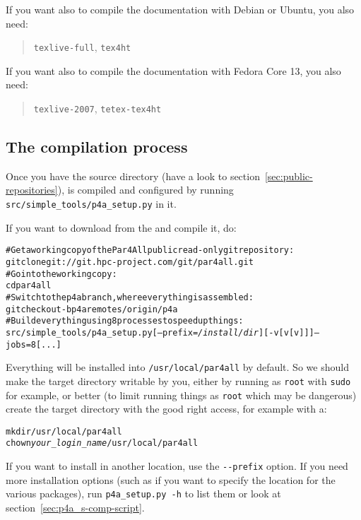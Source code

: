 \documentclass[a4paper]{article}
\begin{document}

If you want also to compile the documentation with Debian or Ubuntu, you 
also need:
\begin{quote}
  \texttt{texlive-full}, \texttt{tex4ht}
\end{quote}

If you want also to compile the documentation with Fedora Core 13, you 
also need:
\begin{quote}
  \texttt{texlive-2007}, \texttt{tetex-tex4ht}
\end{quote}

\subsection{The compilation process}
\label{sec:compilation-process}

Once you have the \Apfa source directory (have a look to
section~\ref{sec:public-repositories}), \Apfa is compiled and configured
by running \verb|src/simple_tools/p4a_setup.py| in it.

If you want to download \Apfa from the \Agit and compile it, do:
\begin{alltt}
# Get a working copy of the Par4All public read-only git repository:
git clone git://git.hpc-project.com/git/par4all.git
# Go into the working copy:
cd par4all
# Switch to the p4a branch, where everything is assembled:
git checkout -b p4a remotes/origin/p4a
# Build everything using 8 processes to speed up things:
src/simple_tools/p4a_setup.py [--prefix=\emph{/install/dir}] [-v[v[v]]] --jobs=8 [...]
\end{alltt}%
Everything will be installed into \verb|/usr/local/par4all| by default.
So we should make the target directory writable by you, either by running
as \texttt{root} with \texttt{sudo} for example, or better (to limit
running things as \texttt{root} which may be dangerous) create the target
directory with the good right access, for example with a:
\begin{alltt}
mkdir /usr/local/par4all
chown \emph{your_login_name} /usr/local/par4all
\end{alltt}

If you want to install in another location, use the \verb|--prefix|
option.  If you need more installation options (such as if you want to
specify the location for the various packages), run \verb|p4a_setup.py -h| to
list them or look at section~\ref{sec:p4a_s-comp-script}.
\end{document}
